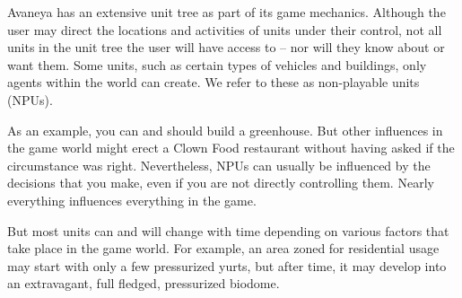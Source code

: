 

Avaneya has an extensive unit tree as part of its game mechanics. Although the user may direct the locations and activities of units under their control, not all units in the unit tree the user will have access to -- nor will they know about or want them. Some units, such as certain types of vehicles and buildings, only agents within the world can create. We refer to these as non-playable units (NPUs).

As an example, you can and should build a greenhouse. But other influences in the game world might erect a Clown Food restaurant without having asked if the circumstance was right. Nevertheless, NPUs can usually be influenced by the decisions that you make, even if you are not directly controlling them. Nearly everything influences everything in the game.

But most units can and will change with time depending on various factors that take place in the game world. For example, an area zoned for residential usage may start with only a few pressurized yurts, but after time, it may develop into an extravagant, full fledged, pressurized biodome.

